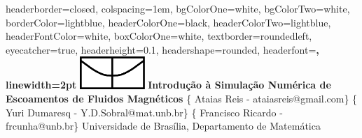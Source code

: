 \documentclass[portrait,a0paper,fontscale=0.42]{baposter} %
\begin{document}
\begin{poster}
{
headerborder=closed, %
colspacing=1em, %
bgColorOne=white, %
bgColorTwo=white, %
borderColor=lightblue, %
headerColorOne=black, %
headerColorTwo=lightblue, %
headerFontColor=white, %
boxColorOne=white, %
textborder=roundedleft, %
eyecatcher=true, %
headerheight=0.1\textheight, %
headershape=rounded, %
headerfont=\Large\bf\textsc, %
linewidth=2pt %
}
%
{\includegraphics[height=3.3em]{unbblack.jpg}} %
{\bf{Introdução à Simulação Numérica de Escoamentos de Fluidos Magnéticos}\vspace{0.5em}} %
{{\{ Ataias Reis - ataiasreis@gmail.com\} \{ Yuri Dumaresq - Y.D.Sobral@mat.unb.br\} \{ Francisco Ricardo - frcunha@unb.br\} \hspace{12pt} Universidade de Brasília, Departamento de Matemática}} %





\end{poster}
\end{document}
